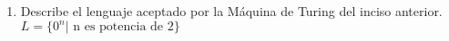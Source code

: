 \documentclass{article}
\begin{document}
\begin{enumerate}
{\begin{enumerate}
{    	Y codificamos la cadena: 011011011011011011011011\\
    	}
    \end{enumerate}
		}
		\item {
		Describe el lenguaje aceptado por la Máquina de Turing del inciso anterior.\\
		
		$L = \{0^n | \text{ n es potencia de } 2 \}$
		}
        
    \end{enumerate}
\end{document}
